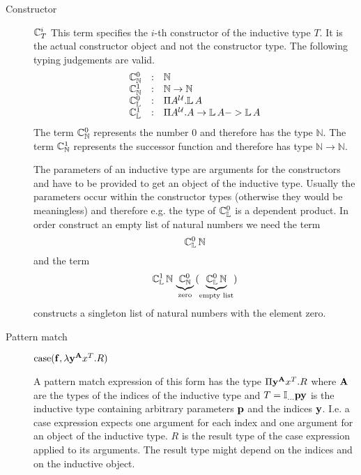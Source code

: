 \begin{description}
\item[Constructor] $\mathbb{C}^i_T$ This term specifies the $i$-th
  constructor of the inductive type $T$. It is the actual constructor object
  and not the constructor type. The following typing judgements are valid.
  $$
  \begin{array}{lll}
    \mathbb{C}^0_\mathbb{N}
    &:& \mathbb{N}
    \\
    \mathbb{C}^1_\mathbb{N}
    &:& \mathbb{N} \to \mathbb{N}
    \\
    \mathbb{C}^0_\mathbb{L}
    &:& \Pi A^{\cal{U}}. \mathbb{L} \, A
    \\
    \mathbb{C}^1_\mathbb{L}
    &:& \Pi A^{\cal{U}}. A \to \mathbb{L}\, A -> \mathbb{L}\,A
  \end{array}
  $$
  The term $\mathbb{C}^0_{\mathbb{N}}$ represents the number $0$ and
  therefore has the type $\mathbb{N}$. The term $\mathbb{C}^1_{\mathbb{N}}$
  represents the successor function and therefore has type
  $\mathbb{N}\to\mathbb{N}$.

  The parameters of an inductive type are arguments for the constructors and
  have to be provided to get an object of the inductive type. Usually the
  parameters occur within the constructor types (otherwise they would be
  meaningless) and therefore e.g. the type of $\mathbb{C}^0_{\mathbb{L}}$ is
  a dependent product. In order construct an empty list of natural numbers we
  need the term
  $$
  \mathbb{C}^0_{\mathbb{L}} \, \mathbb{N}
  $$
  and the term
  $$
  \mathbb{C}^1_{\mathbb{L}}
  \,
  \mathbb{N}
  \,
  \underbrace{\mathbb{C}^0_{\mathbb{N}}}_{\text{zero}}
  \,
  (\underbrace{\mathbb{C}^0_{\mathbb{L}} \, \mathbb{N}}_{\text{empty list}})
  $$
  constructs a singleton list of natural numbers with the element zero.


\item[Pattern match]
    $\text{case}(\mathbf{f}, \lambda \mathbf{y}^{\mathbf{A}} x^T. R)$

    A pattern match expression of this form has the type $\Pi \mathbf{y}^{\mathbf{A}}
    x^T.R$ where $\mathbf{A}$ are the types of the indices of the inductive type and
    $T = \mathbb{I}_{\ldots} \mathbf{p} \mathbf{y}$ is the inductive type containing
    arbitrary parameters $\mathbf{p}$ and the indices $\mathbf{y}$.  I.e. a case
    expression expects one argument for each index and one argument for an
    object of the inductive type. $R$ is the result type of the case expression
    applied to its arguments. The result type might depend on the indices and on
    the inductive object.


\end{description}
